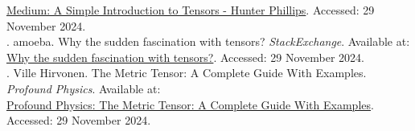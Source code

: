\documentclass[12pt,letterpaper, onecolumn]{exam}
\begin{document}
\href{https://medium.com/@hunter-j-phillips/a-simple-introduction-to-tensors-c4a8321efffc}{Medium: A Simple Introduction to Tensors - Hunter Phillips}. Accessed: 29 November 2024.
\vspace{1em}\\
. amoeba. Why the sudden fascination with tensors? \textit{StackExchange}. Available at:\\
\href{https://stats.stackexchange.com/questions/198061/why-the-sudden-fascination-with-tensors}{Why the sudden fascination with tensors?}. Accessed: 29 November 2024.
\vspace{1em}\\
. Ville Hirvonen. The Metric Tensor: A Complete Guide With Examples. \textit{Profound Physics}. Available at:\\
\href{https://profoundphysics.com/metric-tensor-a-complete-guide-with-examples/}{Profound Physics: The Metric Tensor: A Complete Guide With Examples}. Accessed: 29 November 2024.
\endgroup
\end{document}
